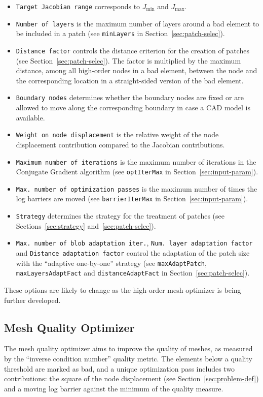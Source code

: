 \documentclass[12pt,a4paper,a4wide]{article}
\begin{document}
\begin{itemize}
\item \texttt{Target Jacobian range} corresponds to $J_{\min}$ and
$J_{\max}$.
\item \texttt{Number of layers} is the maximum number of layers
around a bad element to be included in a patch (see \texttt{minLayers}
in Section~\ref{sec:patch-selec}).
\item \texttt{Distance factor} controls the distance criterion
for the creation of patches (see Section~\ref{sec:patch-selec}). The
factor is multiplied by the maximum distance, among all high-order
nodes in a bad element, between the node and the corresponding location
in a straight-sided version of the bad element.
\item \texttt{Boundary nodes} determines whether the boundary nodes
are fixed or are allowed to move along the corresponding boundary
in case a CAD model is available.
\item \texttt{Weight on node displacement} is the relative weight
of the node displacement contribution compared to the Jacobian
contributions.
\item \texttt{Maximum number of iterations} is the maximum number
of iterations in the Conjugate Gradient algorithm (see
\texttt{optIterMax} in Section~\ref{sec:input-param}).
\item \texttt{Max. number of optimization passes} is the maximum number
of times the log barriers are moved (see \texttt{barrierIterMax} in
Section~\ref{sec:input-param}).
\item \texttt{Strategy} determines the strategy for the treatment of
patches (see Sections~\ref{sec:strategy} and~\ref{sec:patch-selec}).
\item \texttt{Max. number of blob adaptation iter.},
\texttt{Num. layer adaptation factor} and
\texttt{Distance adaptation factor} control the adaptation of the
patch size with the ``adaptive one-by-one'' strategy (see
\texttt{maxAdaptPatch}, \texttt{maxLayersAdaptFact} and
\texttt{distanceAdaptFact} in Section~\ref{sec:patch-selec}).
\end{itemize}

These options are likely to change as the high-order mesh
optimizer is being further developed.


\subsection{Mesh Quality Optimizer}

The mesh quality optimizer aims to improve the quality of meshes,
as measured by the ``inverse condition number'' quality metric.
The elements below a quality threshold are marked as bad, and a
unique optimization pass includes two contributions: the square
of the node displacement (see Section~\ref{sec:problem-def}) and
a moving log barrier against the minimum of the quality measure.
\end{document}
